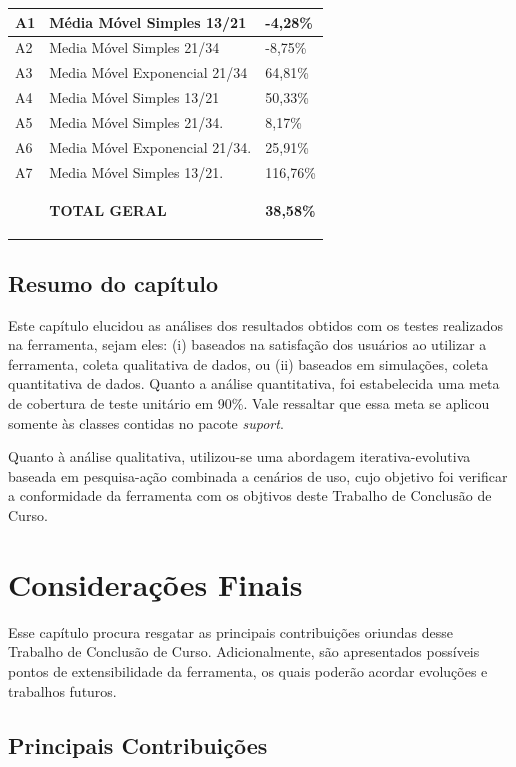 \begin{description}
\begin{center}
\begin{longtable}{| p{2cm} | p{10cm} |p{2cm} |}
	A1 & Média Móvel Simples 13/21 & -4,28\% \\ \hline
	A2 & Media Móvel Simples 21/34 & -8,75\% \\ \hline
	A3 & Media Móvel Exponencial 21/34 & 64,81\% \\ \hline
	A4 & Media Móvel Simples  13/21 & 50,33\% \\ \hline
	A5 & Media Móvel Simples 21/34. & 8,17\% \\ \hline
	A6 & Media Móvel Exponencial 21/34. & 25,91\% \\ \hline
	A7 & Media Móvel Simples  13/21. & 116,76\% \\ \hline
	{} & \textbf{TOTAL GERAL} & \textbf{38,58\%} 
	
\label{t11}
\end{longtable}
\end{center} 
\end{description}

\section{Resumo do capítulo}

Este capítulo elucidou as análises dos resultados obtidos com os testes realizados na ferramenta, sejam eles: (i) baseados na satisfação dos usuários ao utilizar a ferramenta, coleta qualitativa de dados, ou (ii) baseados em simulações, coleta quantitativa de dados. Quanto a análise quantitativa, foi estabelecida uma meta de cobertura de teste unitário em 90\%. Vale ressaltar que essa meta se aplicou somente às classes contidas no pacote \textit{suport}. 

Quanto à análise qualitativa, utilizou-se uma abordagem iterativa-evolutiva baseada em pesquisa-ação combinada a cenários de uso, cujo objetivo foi verificar a conformidade da ferramenta com os objtivos deste Trabalho de Conclusão de Curso.


\newpage
\chapter[CONSIDERAÇÕES FINAIS]{Considerações Finais}

Esse capítulo procura resgatar as principais contribuições oriundas desse Trabalho de Conclusão de Curso. Adicionalmente, são apresentados possíveis pontos de extensibilidade da ferramenta, os quais poderão acordar evoluções e trabalhos futuros.

\section{Principais Contribuições}

